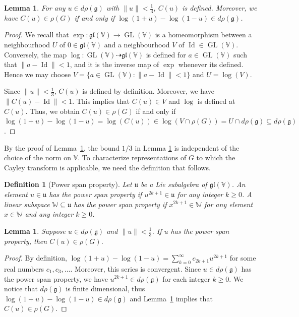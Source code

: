 \documentclass[11pt,reqno]{amsart}
\DeclareMathOperator{\GL}{GL}
\DeclareMathOperator{\Id}{Id}
\newtheorem{lemma}[theorem]{Lemma}
\newtheorem{definition}[theorem]{Definition}
\begin{document}
\begin{lemma} \label{crit:1}
For any $u \in  d\rho (\mathfrak{g})$ with $\lVert u \rVert <  \frac{1}{3}$,  $C(u)$ is defined.  Moreover,  we have $C(u) \in \rho(G)$ if and only if  $\log(1+u)-\log(1-u) \in  d\rho (\mathfrak{g})$.
\end{lemma}
\begin{proof}
We recall that $\exp: \mathfrak{gl}(\mathbb{V}) \to \GL(\mathbb{V})$ is a homeomorphism between a neighbourhood $U$ of $0 \in \mathfrak{gl}(\mathbb{V})$ and a neighbourhood $V$ of $\Id \in \GL(\mathbb{V})$.  Conversely,  the map $\log: \GL(\mathbb{V}) \dasharrow \mathfrak{gl}(\mathbb{V})$ is defined for $a \in \GL(\mathbb{V})$ such that $\lVert a - \Id \rVert < 1$,  and it is the inverse map of $\exp$ whenever its defined.  Hence we may choose $V = \{a\in \GL(\mathbb{V}): \lVert a - \Id \rVert <1 \}$ and $U = \log (V)$.  

Since $\| u \| < \frac{1}{3}$,  $C(u)$ is defined by definition.  Moreover,  we have $\left\|  C(u) - \Id \right\|< 1$.  This implies that $C(u) \in V$ and $\log$ is defined at $C(u)$.  Thus,  we obtain $C(u) \in \rho(G)$ if and only if $\log(1+u)-\log(1-u) = \log(C(u)) \in  \log(V \cap \rho(G))  = U \cap d\rho (\mathfrak{g}) \subseteq d\rho(\mathfrak{g})$.
\end{proof}
By the proof of Lemma~\ref{crit:1},  the bound $1/3$ in Lemma \ref{crit:1} is independent of the choice of the norm on $\mathbb{V}$. To characterize representations of $G$ to which the Cayley transform is applicable,  we need the definition that follows.

\begin{definition}[Power span property]\label{cond:span}
Let $\mathfrak{u}$ be a Lie subalgebra of $\mathfrak{gl}(\mathbb{V})$.  An element $u \in \mathfrak{u}$ has the power span property if $u^{2k+1} \in \mathfrak{u}$ for any  integer $k \ge 0$.  A linear subspace $\mathbb{W} \subseteq \mathfrak{u}$ has the power span property if $x^{2k+1} \in \mathbb{W}$ for any element $x\in \mathbb{W}$ and any integer $k\ge 0$.  
\end{definition}
\begin{lemma}\label{cor: power span}
Suppose $u \in  d\rho (\mathfrak{g})$ and $\|u\| < \frac{1}{3}$.  If $u$ has the power span property,  then $C(u) \in \rho(G)$.
\end{lemma}
\begin{proof}
By definition,  $\log(1+u)-\log(1-u) = \sum_{k=0}^{\infty} c_{2k+1} u^{2k+1}$ for some real numbers $c_1,c_3,\dots$.  Moreover,  this series is convergent.  Since $u \in d\rho (\mathfrak{g})$ has the power span property,  we have $u^{2k+1} \in d\rho (\mathfrak{g})$ for each integer $k \ge 0$.  We notice that  $d\rho (\mathfrak{g})$ is finite dimensional,  thus $\log(1+u)-\log(1-u) \in d\rho (\mathfrak{g})$ and Lemma~\ref{crit:1} implies that $C(u) \in \rho(G)$.
\end{proof}
\end{document}

